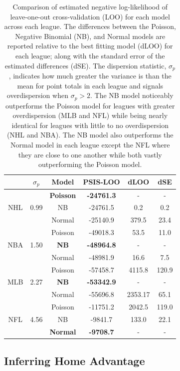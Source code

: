 \begin{table}
\centering
\begin{tabular}{c@{\hskip0.35in}c@{\hskip0.35in}c@{\hskip 0.25in}c@{\hskip 0.25in}c@{\hskip 0.15in}c}
\toprule
& \boldmath$\sigma_p$ & \textbf{Model} & \textbf{PSIS-LOO} & \textbf{dLOO} & \textbf{dSE}\\
\midrule
&& \textbf{Poisson} & \textbf{-24761.3} & - & -\\
NHL & 0.99 & NB & -24761.5 & 0.2 & 0.2\\
&& Normal & -25140.9 & 379.5 & 23.4\\
\midrule
&& Poisson & -49018.3 & 53.5 & 11.0\\
NBA & 1.50 & \textbf{NB} & \textbf{-48964.8} & - & -\\
&& Normal & -48981.9 & 16.6 & 7.5\\
\midrule
&& Poisson & -57458.7 & 4115.8 & 120.9\\
MLB & 2.27 & \textbf{NB} & \textbf{-53342.9} & - & -\\
&& Normal & -55696.8 & 2353.17 & 65.1\\
\midrule
&& Poisson & -11751.2 & 2042.5 & 119.0\\
NFL & 4.56 & NB & -9841.7 & 133.0 & 22.1\\
&& \textbf{Normal} & \textbf{-9708.7} & - & -\\
\bottomrule
\end{tabular}
\caption{Comparison of estimated negative log-likelihood of leave-one-out cross-validation (LOO) for each model across each league. The differences between the Poisson, Negative Binomial (NB), and Normal models are reported relative to the best fitting model (dLOO) for each league; along with the standard error of the estimated differences (dSE). The dispersion statistic, \(\sigma_p\), indicates how much greater the variance is than the mean for point totals in each league and signals overdispersion when \(\sigma_p > 2\). The NB model noticeably outperforms the Poisson model for leagues with greater overdispersion (MLB and NFL) while being nearly identical for leagues with little to no overdispersion (NHL and NBA). The NB model also outperforms the Normal model in each league except the NFL where they are close to one another while both vastly outperforming the Poisson model.}\label{tab:loo}
\end{table}

\subsection{Inferring Home Advantage}

